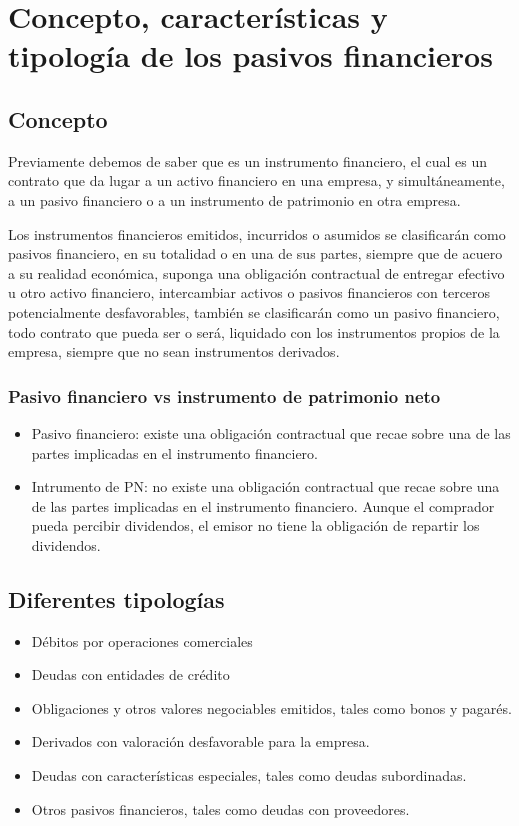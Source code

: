 \section{Concepto, características y tipología de los pasivos financieros}

\subsection{Concepto}

Previamente debemos de saber que es un instrumento financiero, el cual es un contrato que da lugar a un activo financiero en una empresa, y simultáneamente, a un pasivo financiero o a un instrumento de patrimonio en otra empresa.

Los instrumentos financieros emitidos, incurridos o asumidos se clasificarán como pasivos financiero, en su totalidad o en una de sus partes, siempre que de acuero a su realidad económica, suponga una obligación contractual de entregar efectivo u otro activo financiero, intercambiar activos o pasivos financieros con terceros potencialmente desfavorables, también se clasificarán como un pasivo financiero, todo contrato que pueda ser o será, liquidado con los instrumentos propios de la empresa, siempre que no sean instrumentos derivados.

\subsubsection{Pasivo financiero vs instrumento de patrimonio neto}

\begin{itemize}
    \item Pasivo financiero: existe una obligación contractual que recae sobre una de las partes implicadas en el instrumento financiero. 
    \item Intrumento de PN: no existe una obligación contractual que recae sobre una de las partes implicadas en el instrumento financiero. Aunque el comprador pueda percibir dividendos, el emisor no tiene la obligación de repartir los dividendos.
\end{itemize}

\subsection{Diferentes tipologías}

\begin{itemize}
    \item Débitos por operaciones comerciales
    \item Deudas con entidades de crédito
    \item Obligaciones y otros valores negociables emitidos, tales como bonos y pagarés.
    \item Derivados con valoración desfavorable para la empresa.
    \item Deudas con características especiales, tales como deudas subordinadas.
    \item Otros pasivos financieros, tales como deudas con proveedores.
\end{itemize}

